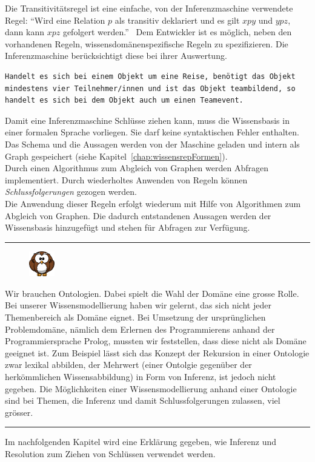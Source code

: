 Die Transitivitätsregel ist eine einfache, von der Inferenzmaschine verwendete Regel: ``Wird eine Relation $p$ als transitiv deklariert und es gilt $x p y$ und $y p z$, dann kann $x p z$ gefolgert werden.''~\cite[S. 289]{IspekOntoBedeutung}
Dem Entwickler ist es möglich, neben den vorhandenen Regeln, wissensdomänenspezifische Regeln zu spezifizieren. Die Inferenzmaschine berücksichtigt diese bei ihrer Auswertung.

\begin{lstlisting}[caption={Beispiel einer Regel in einer Wissensbasis.}]
Handelt es sich bei einem Objekt um eine Reise, benötigt das Objekt mindestens vier Teilnehmer/innen und ist das Objekt teambildend, so handelt es sich bei dem Objekt auch um einen Teamevent.
\end{lstlisting}

Damit eine Inferenzmaschine Schlüsse ziehen kann, muss die Wissensbasis in einer formalen Sprache vorliegen. Sie darf keine syntaktischen Fehler enthalten. Das Schema und die Aussagen werden von der Maschine geladen und intern als Graph gespeichert (siehe Kapitel~\ref{chap:wissensrepFormen}).\\
Durch einen Algorithmus zum Abgleich von Graphen werden Abfragen implementiert. Durch wiederholtes Anwenden von Regeln können \textit{Schlussfolgerungen} gezogen werden.\\ Die Anwendung dieser Regeln erfolgt wiederum mit Hilfe von Algorithmen zum Abgleich von Graphen. Die dadurch entstandenen Aussagen werden der Wissensbasis hinzugefügt und stehen für Abfragen zur Verfügung.

\noindent\rule[1ex]{\textwidth}{1pt}
\begin{figure}
    \vspace{-14pt}
    \includegraphics[width=0.1\textwidth]{bilder/owl.png}
\end{figure}
Wir brauchen Ontologien. Dabei spielt die Wahl der Domäne eine grosse Rolle. Bei unserer Wissensmodellierung haben wir gelernt, das sich nicht jeder Themenbereich als Domäne eignet.
Bei Umsetzung der ursprünglichen Problemdomäne, nämlich dem Erlernen des Programmierens anhand der Programmiersprache Prolog, mussten wir feststellen, dass diese nicht als Domäne geeignet ist. Zum Beispiel lässt sich das Konzept der Rekursion in einer Ontologie zwar lexikal abbilden, der Mehrwert (einer Ontolgie gegenüber der herkömmlichen Wissensabbildung) in Form von Inferenz, ist jedoch nicht gegeben. Die Möglichkeiten einer Wissensmodellierung anhand einer Ontologie sind bei Themen, die Inferenz und damit Schlussfolgerungen zulassen, viel grösser.
\noindent\rule[1ex]{\textwidth}{1pt}

Im nachfolgenden Kapitel wird eine Erklärung gegeben, wie Inferenz und Resolution zum Ziehen von Schlüssen verwendet werden.

